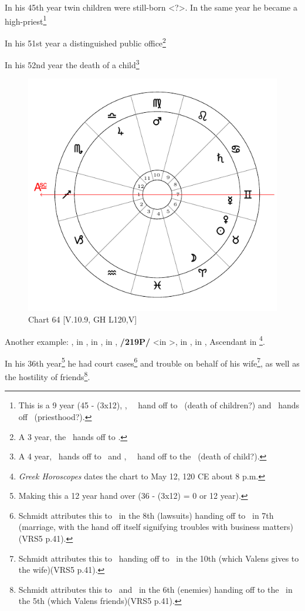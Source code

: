 In his 45th year twin children were still-born <?>. In the same
year he became a high-priest\footnote{This is a 9 year (45 - (3x12),  \Sun, \Mercury\, \Saturn\, hand off to \Mars\, (death of children?) and \Jupiter\, hands off \Venus\, (priesthood?).}

In his 51st year a distinguished public office\footnote{A 3 year, the \Moon\, hands off to \Jupiter.}

In his 52nd year the death of a child\footnote{A 4 year, \Jupiter\, hands off to \Mars\, and \Saturn, \Mercury\, \Sun\, hand off to the \Moon\, (death of child?).}


\newpage
\begin{figure}
\centering

\includegraphics[width=.68\textwidth]{charts/5_10_09}
\caption{Chart 64 [V.10.9, GH L120,V]}
\label{fig:chart64}
\end{figure}

\noindent Another example: \Sun, \Venus\xspace in \Taurus, \Moon\xspace in \Aries, \Saturn\xspace in \Cancer, \textbf{/219P/} \Jupiter <in \Libra>, \Mars\xspace in \Virgo, \Mercury\xspace in \Gemini, Ascendant in \Sagittarius\footnote{\textit{Greek Horoscopes} dates the chart to May 12, 120 CE about 8 p.m.}. 

In his 36th year\footnote{Making this a 12 year hand over (36 - (3x12) = 0 or 12 year).} he had court cases\footnote{Schmidt attributes this to \Saturn\, in the 8th (lawsuits) handing off to \Mercury\, in 7th (marriage, with the hand off itself signifying troubles with business matters) (VRS5 p.41).} and trouble on behalf of his wife\footnote{Schmidt attributes this to \Jupiter\, handing off to \Mars\, in the 10th (which Valens gives to the wife)(VRS5 p.41).}, as well as the hostility of friends\footnote{Schmidt attributes this to \Sun\, and \Venus\, in the 6th (enemies) handing off to the \Moon\, in the 5th (which Valens friends)(VRS5 p.41).}.

